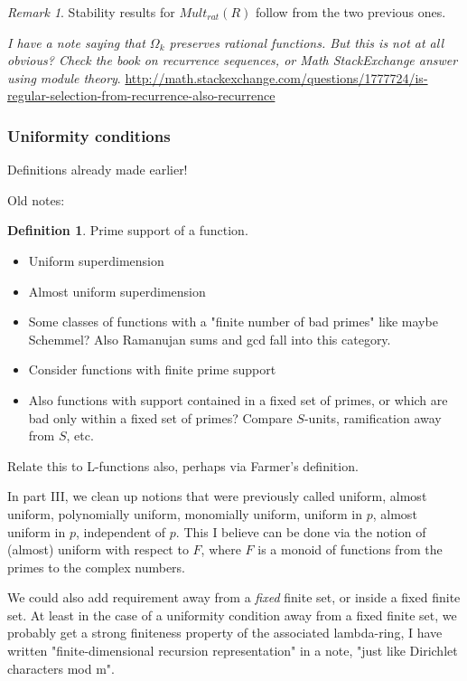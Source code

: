 \documentclass[a4paper]{article}
\theoremstyle{definition}
\newtheorem{definition}{Definition}[section]
\theoremstyle{remark}
\newtheorem*{remark}{Remark}
\begin{document}
\begin{remark}
Stability results for $Mult_{rat}(R)$ follow from the two previous ones.
\end{remark}




\emph{I have a note saying that $\Omega_k$ preserves rational functions. But this is not at all obvious? Check the book on recurrence sequences, or Math StackExchange answer using module theory}.
\url{http://math.stackexchange.com/questions/1777724/is-regular-selection-from-recurrence-also-recurrence}


\subsubsection{Uniformity conditions}

Definitions already made earlier!

Old notes:


\begin{definition}
Prime support of a function.
\end{definition}

\begin{itemize}
\item Uniform superdimension
\item Almost uniform superdimension
\item Some classes of functions with a "finite number of bad primes" like maybe Schemmel? Also Ramanujan sums and gcd fall into this category.
\item Consider functions with finite prime support
\item Also functions with support contained in a fixed set of primes, or which are bad only within a fixed set of primes? Compare $S$-units, ramification away from $S$, etc. 
\end{itemize}
Relate this to L-functions also, perhaps via Farmer's definition.



In part III, we clean up notions that were previously called uniform, almost uniform, polynomially uniform, monomially uniform, uniform in $p$, almost uniform in $p$, independent of $p$. This I believe can be done via the notion of (almost) uniform with respect to $F$, where $F$ is a monoid of functions from the primes to the complex numbers. 

We could also add requirement away from a \emph{fixed} finite set, or inside a fixed finite set. At least in the case of a uniformity condition away from a fixed finite set, we probably get a strong finiteness property of the associated lambda-ring, I have written "finite-dimensional recursion representation" in a note, "just like Dirichlet characters mod m". 
\end{document}
